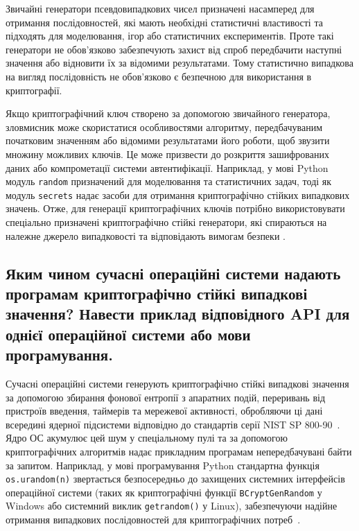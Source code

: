 Звичайні генератори псевдовипадкових чисел призначені насамперед для отримання послідовностей, які мають необхідні статистичні властивості та підходять для моделювання, 
ігор або статистичних експериментів. Проте такі генератори не обов'язково забезпечують захист від спроб передбачити наступні значення або відновити їх за відомими результатами. 
Тому статистично випадкова на вигляд послідовність не обов'язково є безпечною для використання в криптографії.

Якщо криптографічний ключ створено за допомогою звичайного генератора, зловмисник може скористатися особливостями алгоритму, передбачуваним початковим значенням 
або відомими результатами його роботи, щоб звузити множину можливих ключів. Це може призвести до розкриття зашифрованих даних або компрометації системи автентифікації. 
Наприклад, у мові Python модуль \texttt{random} призначений для моделювання та статистичних задач, тоді як модуль \texttt{secrets} надає засоби для отримання криптографічно 
стійких випадкових значень. Отже, для генерації криптографічних ключів потрібно використовувати спеціально призначені криптографічно стійкі генератори, які спираються 
на належне джерело випадковості та відповідають вимогам безпеки \cite{RFC4086,PythonRandom,PythonSecrets}.

\subsection{Яким чином сучасні операційні системи надають програмам криптографічно стійкі випадкові значення? Навести приклад відповідного API для однієї операційної системи або мови програмування.}

Сучасні операційні системи генерують криптографічно стійкі випадкові значення за допомогою
збирання фонової ентропії з апаратних подій, переривань від пристроїв введення, таймерів та
мережевої активності, обробляючи ці дані всередині ядерної підсистеми відповідно до стандартів серії
NIST SP 800-90~\cite{SP800-90A}.  Ядро ОС акумулює цей шум у спеціальному пулі та за допомогою
криптографічних алгоритмів надає прикладним програмам непередбачувані байти за запитом.
Наприклад, у мові програмування Python стандартна функція \texttt{os.urandom(n)} звертається
безпосередньо до захищених системних інтерфейсів операційної системи (таких як криптографічні функції
\texttt{BCryptGenRandom} у Windows або системний виклик \texttt{getrandom()} у Linux), забезпечуючи
надійне отримання випадкових послідовностей для криптографічних потреб~\cite{cryptography}.

